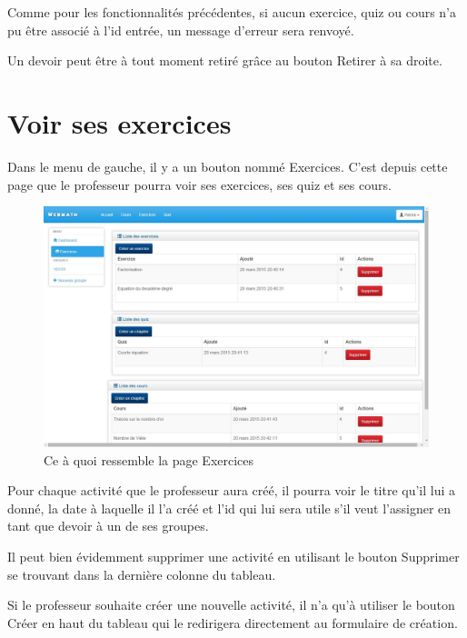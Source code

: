\documentclass[letterpaper,10pt,french]{sphinxmanual}
\begin{document}
Comme pour les fonctionnalités précédentes, si aucun exercice, quiz ou cours
n'a pu être associé à l'id entrée, un message d'erreur sera renvoyé.

Un devoir peut être à tout moment retiré grâce au bouton Retirer à sa droite.


\section{Voir ses exercices}
\label{dashboard:voir-ses-exercices}
Dans le menu de gauche, il y a un bouton nommé Exercices. C'est depuis cette
page que le professeur pourra voir ses exercices, ses quiz et ses cours.
\begin{figure}[htbp]
\centering
\capstart

\includegraphics[width=0.700\linewidth]{exercices.jpg}
\caption{Ce à quoi ressemble la page Exercices}\end{figure}

Pour chaque activité que le professeur aura créé, il pourra voir le titre qu'il
lui a donné, la date à laquelle il l'a créé et l'id qui lui sera utile s'il veut
l'assigner en tant que devoir à un de ses groupes.

Il peut bien évidemment supprimer une activité en utilisant le bouton Supprimer
se trouvant dans la dernière colonne du tableau.

Si le professeur souhaite créer une nouvelle activité, il n'a qu'à utiliser le
bouton Créer en haut du tableau qui le redirigera directement au formulaire de
création.
\end{document}
